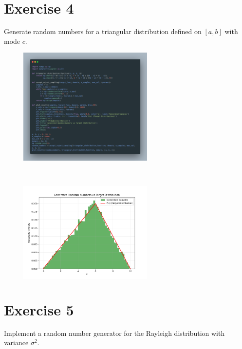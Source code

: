 \documentclass[a4paper,12pt]{article}
\begin{document}
\section{Exercise 4}
Generate random numbers for a triangular distribution defined on $[a, b]$ with mode $c$.
\begin{figure}[h!]
    \centering
    \includegraphics[width=0.6\textwidth]{./Screenshots/4.py.png} 
\end{figure} \\
\begin{figure}[h!]
    \centering
    \includegraphics[width=0.6\textwidth]{./Screenshots/4.png} 
\end{figure} 
\newpage

\section{Exercise 5}
Implement a random number generator for the Rayleigh distribution with variance $\sigma^2$.
\end{document}
